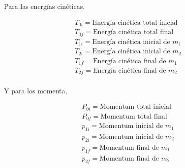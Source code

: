 \documentclass[a4paper,10pt]{article}
\begin{document}
 
Para las energías cinéticas,
 
 \begin{gather*}
  T_{0i} = \textrm{Energía cinética total inicial} \\
%
  T_{0f} = \textrm{Energía cinética total final} \\
%  
%  
   T_{1i} = \textrm{Energía cinética inicial de } m_1 \\
%   
   T_{2i} = \textrm{Energía cinética inicial de } m_2 \\
%  
  T_{1f} = \textrm{Energía cinética final de } m_1 \\
%  
  T_{2f} = \textrm{Energía cinética final de } m_2 \\
%
\label{eq:energiasCineticas}
  \end{gather*}
  
Y para los momenta,

 \begin{gather*}
  P_{0i} = \textrm{Momentum total inicial} \\
  P_{0f} = \textrm{Momentum total final} \\
%  
   p_{1i} = \textrm{Momentum inicial de } m_1 \\
%   
   p_{2i} = \textrm{Momentum inicial de } m_2 \\
%  
  p_{1f} = \textrm{Momentum final de } m_1 \\
%  
  p_{2f} = \textrm{Momentum final de } m_2 \\
%
\label{eq:Momenta}
  \end{gather*}
  
\end{document}
